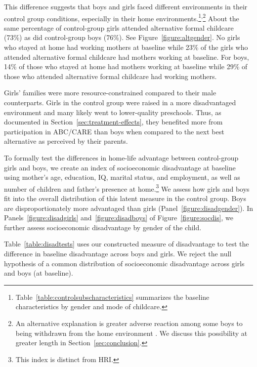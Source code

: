 This difference suggests that boys and girls faced different environments in their control group conditions, especially in their home environments.\footnote{Table~\ref{table:controlsubscharacteristics} summarizes the baseline characteristics by gender and mode of childcare.}\textsuperscript{,}\footnote{An alternative explanation is greater adverse reaction among some boys to being withdrawn from the home environment \citep{Garcia_etal_2019_ECE_IMHJ}. We discuss this possibility at greater length in Section~\ref{sec:conclusion}.} About the same percentage of control-group girls attended alternative formal childcare (73\%) as did control-group boys (76\%). See Figure~\ref{figure:altgender}. No girls who stayed at home had working mothers at baseline while 23\% of the girls who attended alternative formal childcare had mothers working at baseline. For boys, 14\% of those who stayed at home had mothers working at baseline while 29\% of those who attended alternative formal childcare had working mothers.

Girls' families were more resource-constrained compared to their male counterparts. Girls in the control group were raised in a more disadvantaged environment and many likely went to lower-quality preschools. Thus, as documented in Section~\ref{sec:treatment-effects}, they benefited more from participation in ABC/CARE than boys when compared to the next best alternative as perceived by their parents.


To formally test the differences in home-life advantage between control-group girls and boys, we create an index of socioeconomic disadvantage at baseline using mother's age, education, IQ, marital status, and employment, as well as number of children and father's presence at home.\footnote{This index is distinct from HRI.} We assess how girls and boys fit into the overall distribution of this latent measure in the control group. Boys are disproportionately more advantaged than girls (Panel~\ref{figure:disadgender}). In Panels~\ref{figure:disadgirls} and~\ref{figure:disadboys} of Figure~\ref{figure:socdis}, we further assess socioeconomic disadvantage by gender of the child.

Table~\ref{table:disadtests} uses our constructed measure of disadvantage to test the difference in baseline disadvantage across boys and girls. We reject the null hypothesis of a common distribution of socioeconomic disadvantage across girls and boys (at baseline). 

